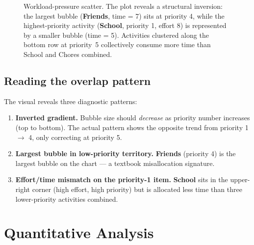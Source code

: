 \documentclass[11pt,a4paper]{article}
\begin{document}
\begin{figure}[h]
\caption{Workload-pressure scatter. The plot reveals a structural inversion: the largest bubble (\textbf{Friends}, time = 7) sits at priority 4, while the highest-priority activity (\textbf{School}, priority 1, effort 8) is represented by a smaller bubble (time = 5). Activities clustered along the bottom row at priority~5 collectively consume more time than School and Chores combined.}
\label{fig:scatter}
\end{figure}

\subsection{Reading the overlap pattern}
The visual reveals three diagnostic patterns:
\begin{enumerate}[leftmargin=1.6em, itemsep=2pt]
  \item \textbf{Inverted gradient.} Bubble size should \emph{decrease} as priority number increases (top to bottom). The actual pattern shows the opposite trend from priority 1 $\rightarrow$ 4, only correcting at priority 5.
  \item \textbf{Largest bubble in low-priority territory.} \textbf{Friends} (priority 4) is the largest bubble on the chart --- a textbook misallocation signature.
  \item \textbf{Effort/time mismatch on the priority-1 item.} \textbf{School} sits in the upper-right corner (high effort, high priority) but is allocated less time than three lower-priority activities combined.
\end{enumerate}

\section{Quantitative Analysis}
\label{sec:analysis}
\end{document}
